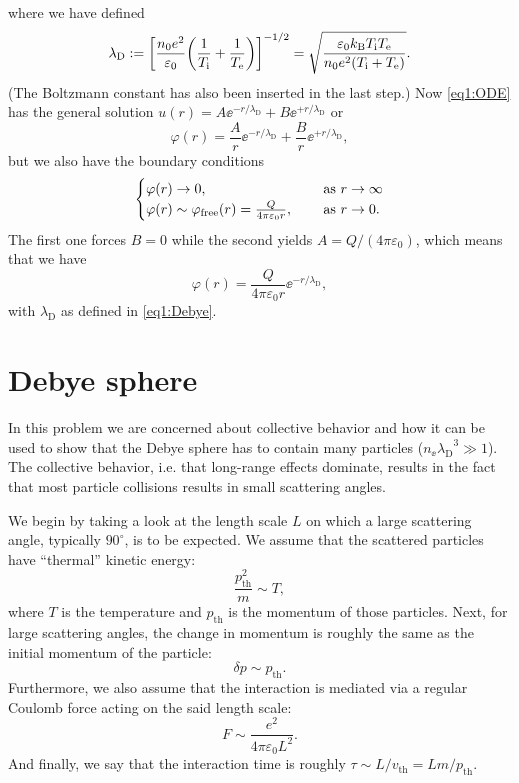 \documentclass[11pt,a4paper, 
english, swedish %
]{article}
\newcommand{\lD}{\ensuremath{\lambda_{\text{D}}}}
\begin{document}
where we have defined
\begin{equation}\label{eq1:Debye}
\lD := \qty[\frac{n_0e^2}{\varepsilon_0}
\qty(\frac{1}{T_\ii}+\frac{1}{T_\ee})]^{-1/2}
=\sqrt{\frac{\varepsilon_0 k_\text{B}T_\ii T_\ee}
{n_0e^2(T_\ii + T_\ee)}}.
\end{equation}
(The Boltzmann constant has also been inserted in the last step.)
Now \eqref{eq1:ODE} has the general solution
$u(r) = A\ee^{-r/\lD} + B\ee^{+r/\lD}$
or 
\begin{equation}
\varphi(r) = \frac{A}{r}\ee^{-r/\lD} + \frac{B}{r}\ee^{+r/\lD},
\end{equation}
but we also have the boundary conditions
\begin{equation}
\begin{cases}
\varphi(r)\to0\qc &\text{ as } r\to\infty\\
\varphi(r)\sim \varphi_{\text{free}}(r) 
= \frac{Q}{4\pi\varepsilon_0r} \qc&\text{ as } r\to0.
\end{cases}
\end{equation}
The first one forces $B=0$ while the second yields 
$A=Q/(4\pi\varepsilon_0)$, which means that we have 
\begin{equation}
\varphi(r)= \frac{Q}{4\pi\varepsilon_0r}\ee^{-r/\lD},
\end{equation}
with $\lD$ as defined in \eqref{eq1:Debye}.

\section{Debye sphere}
In this problem we are concerned about collective behavior and how it
can be used to show that the Debye sphere has to contain many
particles ($n_\ee\lD^3\gg1$). 
The collective behavior, i.e. that long-range effects dominate,
results in the fact that most particle collisions results in small
scattering angles.

We begin by taking a look at the length scale $L$ on which a large
scattering angle, typically $90^\circ$, is to be expected. We assume
that the scattered particles have ``thermal'' kinetic energy:
\begin{equation}
\frac{p_\text{th}^2}{m} \sim T,
\end{equation}
where $T$ is the temperature and $p_\text{th}$ is the momentum of
those particles. Next, for large scattering angles, the change
in momentum is roughly the same as the initial momentum of the
particle:
\begin{equation}
\delta p \sim p_\text{th}.
\end{equation}
Furthermore,  we also assume that the interaction is mediated via a
regular Coulomb force acting on the said length scale:
\begin{equation}
F\sim\frac{e^2}{4\pi\varepsilon_0L^2}.
\end{equation}
And finally, we say that the interaction time is roughly 
$\tau \sim L/v_\text{th} = Lm/p_\text{th}$. 
\end{document}
